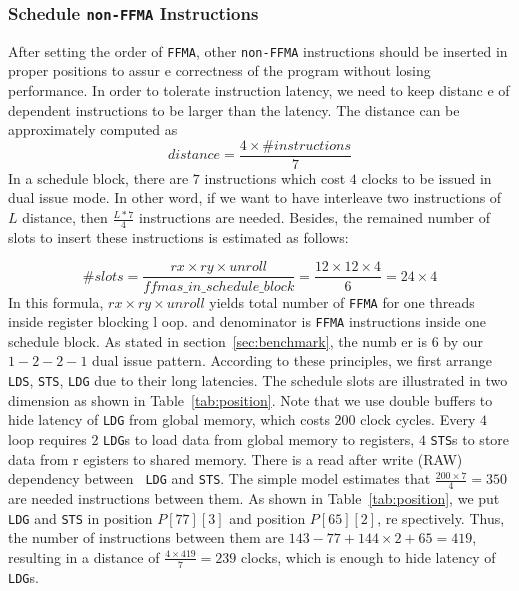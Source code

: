 \subsubsection{Schedule {\tt non-FFMA} Instructions}

After setting the order of {\tt FFMA}, other {\tt non-FFMA} instructions should be inserted in proper positions to assur
e
correctness of the program without losing performance. In order to tolerate instruction latency, we need to keep distanc
e of dependent instructions to be larger than the latency. The distance can be approximately computed as
\begin{displaymath}
distance = \frac{4\times\#instructions}{7}
\end{displaymath}
In a schedule block, there are $7$ instructions which cost $4$ clocks to be issued in dual issue mode. In other word, if
 we want to have interleave
two instructions of $L$ distance, then $\frac{L*7}{4}$ instructions are needed. Besides, the remained number of slots to
 insert these instructions is estimated as follows:

\begin{displaymath}
\#slots = \frac{rx\times ry\times unroll}{ffmas\_in\_schedule\_block}=\frac{12\times 12\times 4}{6}=24\times 4
\end{displaymath}
In this formula, $rx\times ry\times unroll$ yields total number of {\tt FFMA} for one threads inside register blocking l
oop.
and denominator is {\tt FFMA} instructions inside one schedule block. As stated in section~\ref{sec:benchmark}, the numb
er is $6$ by our $1-2-2-1$ dual issue pattern.
According to these principles, we first arrange {\tt LDS}, {\tt STS}, {\tt LDG} due to their long latencies. The
schedule slots are illustrated in two dimension as shown in Table~\ref{tab:position}.
Note that we use double buffers to hide latency of {\tt LDG} from global memory, which costs $200$ clock cycles.
Every $4$ loop requires $2$ {\tt LDG}s to load data from global memory to registers, $4$ {\tt STS}s to store data from r
egisters to shared memory. There is a read after write (RAW) dependency between {\tt
LDG} and {\tt STS}. The simple model estimates that $\frac{200\times 7}{4} = 350$ are needed instructions between them.
As shown in Table~\ref{tab:position}, we put {\tt LDG} and  {\tt STS} in position $P[77][3]$ and position $P[65][2]$, re
spectively. Thus, the number of instructions between them are $143-77 + 144\times 2 +
65=419$, resulting in a distance of $\frac{4\times 419}{7}=239$ clocks, which is enough to hide latency of {\tt LDG}s.

